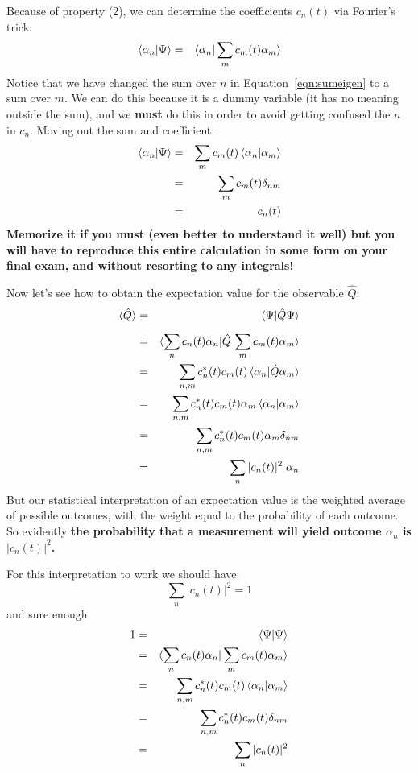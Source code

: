 \documentclass[12pt]{book}
\begin{document}
Because of property (2), we can determine the coefficients $c_n(t)$ via Fourier's trick:
\begin{eqnarray*}
\braket{\alpha_n| \Psi} &=& \braket{\alpha_n | \sum_m c_m(t) \alpha_m}\\
\end{eqnarray*}
Notice that we have changed the sum over $n$ in Equation~\ref{eqn:sumeigen} to a sum over $m$.  We {\rm can} do this because it is a dummy variable (it has no meaning outside the sum), and we {\bf must} do this in order to avoid getting confused the $n$ in $c_n$.  Moving out the sum and coefficient:
\begin{eqnarray*}
\braket{\alpha_n| \Psi} &=& \sum_m c_m(t) \braket{\alpha_n | \alpha_m}\\
 &=& \sum_m c_m(t) \delta_{nm}\\
 &=& c_n(t) \\
\end{eqnarray*}
{\bf Memorize it if you must (even better to understand it well) but you will have to reproduce this entire calculation in some form on your final exam, and without resorting to any integrals!}

Now let's see how to obtain the expectation value for the observable $\hat{Q}$:
\begin{eqnarray*}
\braket{\hat{Q}} &=& \braket{\Psi | \hat{Q} \Psi}\\[5pt]
&=& \braket{\sum_n c_n(t) \alpha_n | \hat{Q} \, \sum_m c_m(t) \alpha_m}\\
&=& \sum_{n,m} c_n^*(t) c_m(t) \braket{\alpha_n | \hat{Q} \alpha_m}\\
&=& \sum_{n,m} c_n^*(t) c_m(t) \alpha_m \braket{\alpha_n | \alpha_m}\\
&=& \sum_{n,m} c_n^*(t) c_m(t) \alpha_m \delta_{nm}\\
&=& \sum_n |c_n(t)|^2 \; \alpha_n
\end{eqnarray*}
But our statistical interpretation of an expectation value is the weighted average of possible outcomes, with the weight equal to the probability of each outcome.  So evidently {\bf \boldmath the probability that a measurement will yield outcome $\alpha_n$ is $|c_n(t)|^2$.}

For this interpretation to work we should have:
$$\sum_n |c_n(t)|^2 = 1$$
and sure enough:
\begin{eqnarray*}
1 &=&\braket{\Psi | \Psi} \\
&=& \braket{\sum_n c_n(t) \alpha_n | \sum_m c_m(t) \alpha_m}\\
&=& \sum_{n,m} c_n^*(t) c_m(t) \braket{\alpha_n | \alpha_m}\\
&=& \sum_{n,m} c_n^*(t) c_m(t) \delta_{nm}\\
&=& \sum_n |c_n(t)|^2 \\ 
\end{eqnarray*}
\end{document}
